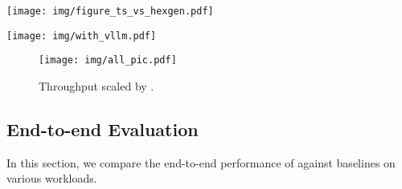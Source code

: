 \begin{figure*}[!t]
    \centering
    \begin{minipage}{0.48\linewidth}
        \texttt{[image: img/figure\_ts\_vs\_hexgen.pdf]}
          \vspace{-2em}
        \caption{}
        \label{fig:e2e}
          \vspace{-1em}
    \end{minipage}\hspace{10pt}
    \begin{minipage}{0.48\linewidth}
        \texttt{[image: img/with\_vllm.pdf]}
          \vspace{-2em}
        \caption{}
        \label{fig:cloudvsdatacenter}
          \vspace{-1em}
    \end{minipage}
\end{figure*}


\begin{figure}[!t]
  \centering
  \texttt{[image: img/all\_pic.pdf]} %
    \vspace{-1em}
  \caption{\small{Throughput scaled by \sys.}}
  \label{fig:throughput}
    \vspace{-1em}
\end{figure}

\subsection{End-to-end Evaluation}
In this section, we compare the end-to-end performance of \sys against baselines on various workloads.




